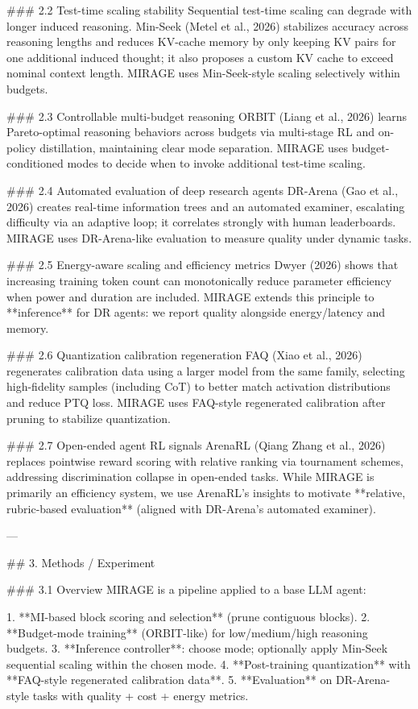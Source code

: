 ### 2.2 Test-time scaling stability  
Sequential test-time scaling can degrade with longer induced reasoning. Min-Seek (Metel et al., 2026) stabilizes accuracy across reasoning lengths and reduces KV-cache memory by only keeping KV pairs for one additional induced thought; it also proposes a custom KV cache to exceed nominal context length. MIRAGE uses Min-Seek-style scaling selectively within budgets.

### 2.3 Controllable multi-budget reasoning  
ORBIT (Liang et al., 2026) learns Pareto-optimal reasoning behaviors across budgets via multi-stage RL and on-policy distillation, maintaining clear mode separation. MIRAGE uses budget-conditioned modes to decide when to invoke additional test-time scaling.

### 2.4 Automated evaluation of deep research agents  
DR-Arena (Gao et al., 2026) creates real-time information trees and an automated examiner, escalating difficulty via an adaptive loop; it correlates strongly with human leaderboards. MIRAGE uses DR-Arena-like evaluation to measure quality under dynamic tasks.

### 2.5 Energy-aware scaling and efficiency metrics  
Dwyer (2026) shows that increasing training token count can monotonically reduce parameter efficiency when power and duration are included. MIRAGE extends this principle to **inference** for DR agents: we report quality alongside energy/latency and memory.

### 2.6 Quantization calibration regeneration  
FAQ (Xiao et al., 2026) regenerates calibration data using a larger model from the same family, selecting high-fidelity samples (including CoT) to better match activation distributions and reduce PTQ loss. MIRAGE uses FAQ-style regenerated calibration after pruning to stabilize quantization.

### 2.7 Open-ended agent RL signals  
ArenaRL (Qiang Zhang et al., 2026) replaces pointwise reward scoring with relative ranking via tournament schemes, addressing discrimination collapse in open-ended tasks. While MIRAGE is primarily an efficiency system, we use ArenaRL’s insights to motivate **relative, rubric-based evaluation** (aligned with DR-Arena’s automated examiner).

---

## 3. Methods / Experiment  

### 3.1 Overview  
MIRAGE is a pipeline applied to a base LLM agent:

1. **MI-based block scoring and selection** (prune contiguous blocks).  
2. **Budget-mode training** (ORBIT-like) for low/medium/high reasoning budgets.  
3. **Inference controller**: choose mode; optionally apply Min-Seek sequential scaling within the chosen mode.  
4. **Post-training quantization** with **FAQ-style regenerated calibration data**.  
5. **Evaluation** on DR-Arena-style tasks with quality + cost + energy metrics.

